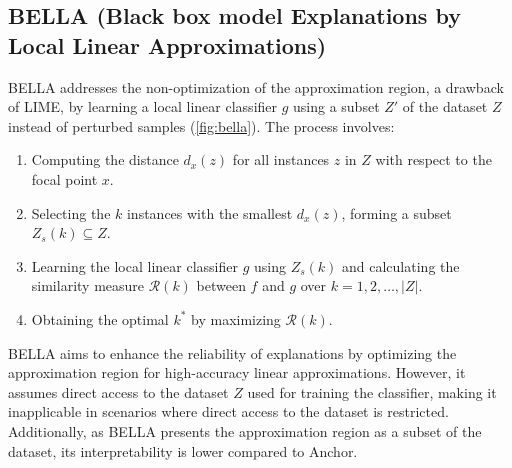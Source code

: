 \documentclass[runningheads]{llncs}
\begin{document}
\subsection{%
  BELLA (Black box model Explanations by Local Linear Approximations)
  \cite{radulovic2023bella}
}
BELLA addresses the non-optimization of the approximation region,
a drawback of LIME,
by learning a local linear classifier $g$
using a subset $Z'$ of the dataset $Z$
instead of perturbed samples (\cref{fig:bella}).
The process involves:
\begin{enumerate}
  \item Computing the distance $d_x(z)$ for all instances $z$ in $Z$
        with respect to the focal point $x$.
  \item Selecting the $k$ instances with the smallest $d_x(z)$,
        forming a subset $Z_s(k) \subseteq Z$.
  \item Learning the local linear classifier $g$ using $Z_s(k)$
        and calculating the similarity measure $\mathcal{R}(k)$ between $f$ and $g$
        over $k=1,2,\dots,|Z|$.
  \item Obtaining the optimal $k^*$ by maximizing $\mathcal{R}(k)$.
\end{enumerate}

BELLA aims to enhance the reliability of explanations
by optimizing the approximation region for high-accuracy linear approximations.
However, it assumes direct access to the dataset $Z$ used for training the classifier,
making it inapplicable in scenarios where direct access to the dataset is restricted.
Additionally,
as BELLA presents the approximation region as a subset of the dataset,
its interpretability is lower compared to Anchor.
\end{document}
